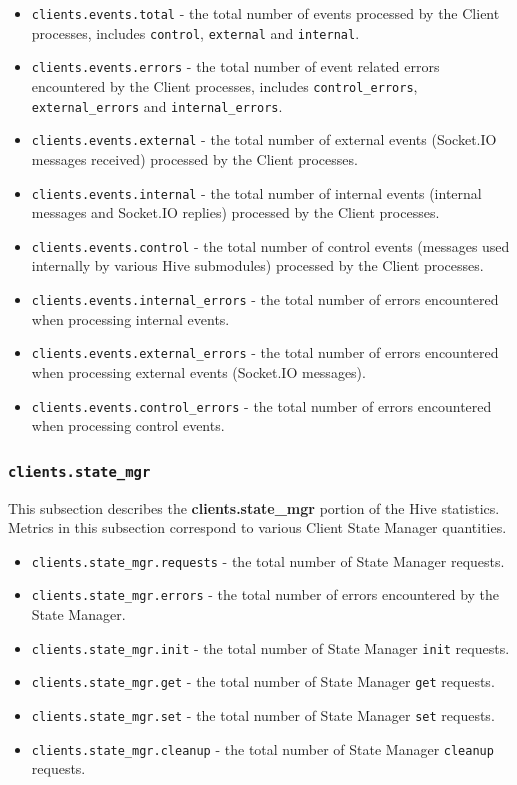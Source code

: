 \documentclass[a4paper]{article}
\begin{document}
\begin{itemize}
\item \texttt{clients.events.total} - the total number of events processed by the Client processes, includes \texttt{control}, \texttt{external} and \texttt{internal}.
\item \texttt{clients.events.errors} - the total number of event related errors encountered by the Client processes, includes \texttt{control\_errors}, \texttt{external\_errors} and \texttt{internal\_errors}.
\item \texttt{clients.events.external} - the total number of external events (Socket.IO messages received) processed by the Client processes.
\item \texttt{clients.events.internal} - the total number of internal events (internal messages and Socket.IO replies) processed by the Client processes.
\item \texttt{clients.events.control} - the total number of control events (messages used internally by various Hive submodules) processed by the Client processes.
\item \texttt{clients.events.internal\_errors} - the total number of errors encountered when processing internal events.
\item \texttt{clients.events.external\_errors} - the total number of errors encountered when processing external events (Socket.IO messages).
\item \texttt{clients.events.control\_errors} - the total number of errors encountered when processing control events.
\end{itemize}
\subsubsection{\texttt{clients.state\_mgr}}
\label{sec-4-2-8}

This subsection describes the \textbf{clients.state\_mgr} portion of the Hive statistics. Metrics in this subsection correspond to various Client State Manager quantities.


\begin{itemize}
\item \texttt{clients.state\_mgr.requests} - the total number of State Manager requests.
\item \texttt{clients.state\_mgr.errors} - the total number of errors encountered by the State Manager.
\item \texttt{clients.state\_mgr.init} - the total number of State Manager \texttt{init} requests.
\item \texttt{clients.state\_mgr.get} - the total number of State Manager \texttt{get} requests.
\item \texttt{clients.state\_mgr.set} - the total number of State Manager \texttt{set} requests.
\item \texttt{clients.state\_mgr.cleanup} - the total number of State Manager \texttt{cleanup} requests.
\end{itemize}
\end{document}
